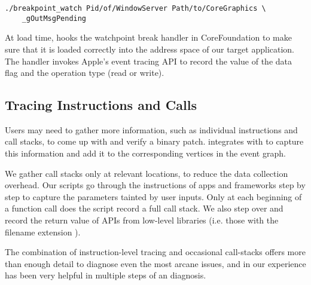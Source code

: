 \begin{lstlisting}
./breakpoint_watch Pid/of/WindowServer Path/to/CoreGraphics \
	_gOutMsgPending
\end{lstlisting}

At load time, \xxx hooks the watchpoint break handler in CoreFoundation to
make sure that it is loaded correctly into the address space of our target
application. The handler invokes Apple's event tracing API to record the value
of the data flag and the operation type (read or write).

\subsection{Tracing Instructions and Calls}

Users may need to gather more information, such as individual instructions and
call stacks, to come up with and verify a binary patch. \xxx integrates with
\vv{lldb} to capture this information and add it to the corresponding vertices
in the event graph.

We gather call stacks only at relevant locations, to reduce the data collection
overhead. Our \vv{lldb} scripts go through the instructions of apps and
frameworks step by step to capture the parameters tainted by user inputs. Only
at each beginning of a function call does the script record a full call stack.
We also step over and record the return value of APIs from low-level libraries
(i.e. those with the filename extension \vv{.dylib}).

The combination of instruction-level tracing and occasional call-stacks offers
more than enough detail to diagnose even the most arcane issues, and in our
experience has been very helpful in multiple steps of an \xxx diagnosis.

